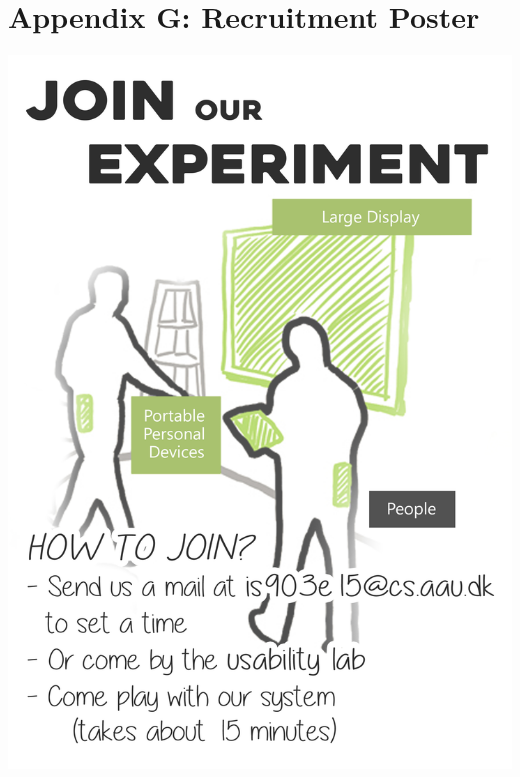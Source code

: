 \section*{Appendix G: Recruitment Poster}
\begin{adjustbox}{width=\textwidth}
	\includegraphics{images/poster.jpg}
\end{adjustbox}